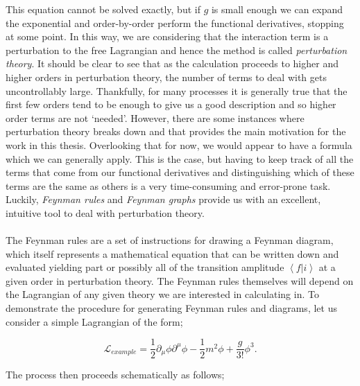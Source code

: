 This equation cannot be solved exactly, but if $g$ is small enough we can expand the exponential and order-by-order perform the functional derivatives, stopping at some point. In this way, we are considering that the interaction term is a perturbation to the free Lagrangian and hence the method is called \emph{perturbation theory}. It should be clear to see that as the calculation proceeds to higher and higher orders in perturbation theory, the number of terms to deal with gets uncontrollably large. Thankfully, for many processes it is generally true that the first few orders tend to be enough to give us a good description and so higher order terms are not `needed'. However, there are some instances where perturbation theory breaks down and that provides the main motivation for the work in this thesis. Overlooking that for now, we would appear to have a formula which we can generally apply. This is the case, but having to keep track of all the terms that come from our functional derivatives and distinguishing which of these terms are the same as others is a very time-consuming and error-prone task. Luckily, \emph{Feynman rules} and \emph{Feynman graphs} provide us with an excellent, intuitive tool to deal with perturbation theory. \\
\\
The Feynman rules are a set of instructions for drawing a Feynman diagram, which itself represents a mathematical equation that can be written down and evaluated yielding part or possibly all of the transition amplitude $\left<f | i \right>$ at a given order in perturbation theory. The Feynman rules themselves will depend on the Lagrangian of any given theory we are interested in calculating in. To demonstrate the procedure for generating Feynman rules and diagrams, let us consider a simple Lagrangian of the form;

\begin{equation}
\mathscr{L}_{example} = \frac{1}{2}\partial_\mu \phi \partial^\mu \phi - \frac{1}{2}m^2 \phi + \frac{g}{3!} \phi^3. 
\end{equation}

The process then proceeds schematically as follows;

